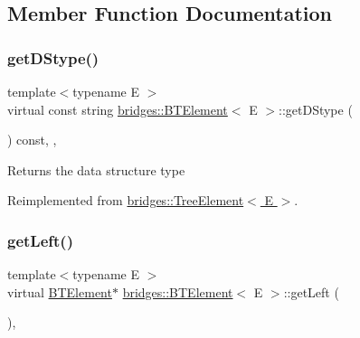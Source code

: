 \subsection{Member Function Documentation}
\hypertarget{classbridges_1_1_b_t_element_a43cc18d2c1e71c399782a306b60e4260}{}\label{classbridges_1_1_b_t_element_a43cc18d2c1e71c399782a306b60e4260} 
\subsubsection{\texorpdfstring{get\+D\+Stype()}{getDStype()}}
{\footnotesize\ttfamily template$<$typename E $>$ \\
virtual const string \hyperlink{classbridges_1_1_b_t_element}{bridges\+::\+B\+T\+Element}$<$ E $>$\+::get\+D\+Stype (\begin{DoxyParamCaption}{ }\end{DoxyParamCaption}) const\hspace{0.3cm}{\ttfamily [inline]}, {\ttfamily [override]}, {\ttfamily [virtual]}}

\begin{DoxyReturn}{Returns}
the data structure type 
\end{DoxyReturn}


Reimplemented from \hyperlink{classbridges_1_1_tree_element_a6b264d7391442a742edf96bdd5ee5442}{bridges\+::\+Tree\+Element$<$ E $>$}.

\hypertarget{classbridges_1_1_b_t_element_ab5955c2611b6ae8c3c48508e3e983f87}{}\label{classbridges_1_1_b_t_element_ab5955c2611b6ae8c3c48508e3e983f87} 
\subsubsection{\texorpdfstring{get\+Left()}{getLeft()}\hspace{0.1cm}{\footnotesize\ttfamily [1/2]}}
{\footnotesize\ttfamily template$<$typename E $>$ \\
virtual \hyperlink{classbridges_1_1_b_t_element}{B\+T\+Element}$\ast$ \hyperlink{classbridges_1_1_b_t_element}{bridges\+::\+B\+T\+Element}$<$ E $>$\+::get\+Left (\begin{DoxyParamCaption}{ }\end{DoxyParamCaption})\hspace{0.3cm}{\ttfamily [inline]}, {\ttfamily [virtual]}}

